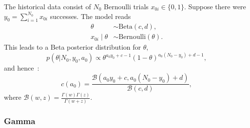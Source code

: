 \documentclass[a4paper, notitlepage, 11pt]{article}
\begin{document}
The historical data consist of $N_0$ Bernoulli trials $x_{0i} \in \{0,1\}$.
Suppose there were $y_0 = \sum_{i=1}^{N_0}x_{0i}$ successes.
The model reads
\begin{align*}
 \theta &\sim \text{Beta}(c, d), \\
 x_{0i} \mid \theta &\sim \text{Bernoulli}(\theta).
\end{align*}
This leads to a Beta posterior distribution for $\theta$,
\begin{equation}
 \label{eq:bernoulli_posterior}
 p(\theta | N_0, y_0, a_0) \propto \theta ^{a_0 y_0 + c - 1} (1-\theta)^{a_0 (N_0 -y_0) + d - 1},
\end{equation}
and hence~\citep{Neuenschwander2009}:
\begin{equation}
 \label{eq:cA0_bernoulli}
 c(a_0) = \frac{\mathcal{B}(a_0 y_0 + c, a_0 (N_0 -y_0) + d)}{\mathcal{B}(c, d)},
\end{equation}
where $\mathcal{B}(w, z) = \frac{\Gamma(w)\Gamma(z)}{\Gamma(w + z)}$.


\subsubsection{Gamma}
\end{document}
